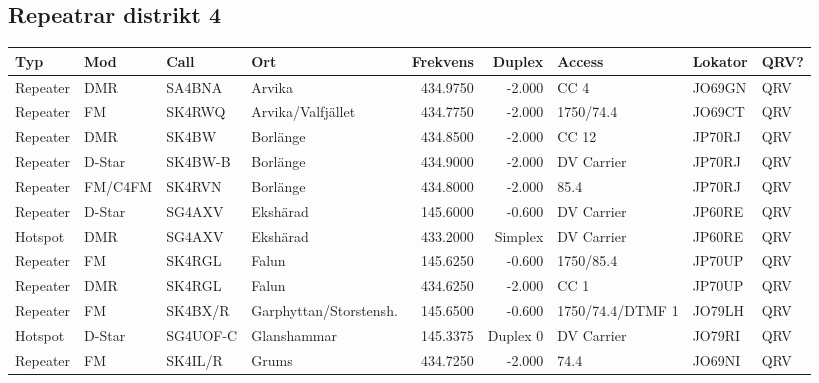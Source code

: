 \begin{landscape}
\clearpage

\subsection{Repeatrar distrikt 4}

\begin{longtable}{llllrrlll}
	\bf Typ  & \bf Mod    & \bf Call & \bf Ort                & \bf Frekvens & \bf Duplex & \bf Access       & \bf Lokator & \bf QRV? \\ \hline
	\endhead
	Repeater & DMR        & SA4BNA   & Arvika                 &     434.9750 &     -2.000 & CC 4             & JO69GN      & QRV      \\
	Repeater & FM         & SK4RWQ   & Arvika/Valfjället      &     434.7750 &     -2.000 & 1750/74.4        & JO69CT      & QRV      \\
	Repeater & DMR        & SK4BW    & Borlänge               &     434.8500 &     -2.000 & CC 12            & JP70RJ      & QRV      \\
	Repeater & D-Star     & SK4BW-B  & Borlänge               &     434.9000 &     -2.000 & DV Carrier       & JP70RJ      & QRV      \\
	Repeater & FM/C4FM    & SK4RVN   & Borlänge               &     434.8000 &     -2.000 & 85.4             & JP70RJ      & QRV      \\
	Repeater & D-Star     & SG4AXV   & Ekshärad               &     145.6000 &     -0.600 & DV Carrier       & JP60RE      & QRV      \\
	Hotspot  & DMR        & SG4AXV   & Ekshärad               &     433.2000 &    Simplex & DV Carrier       & JP60RE      & QRV      \\
	Repeater & FM         & SK4RGL   & Falun                  &     145.6250 &     -0.600 & 1750/85.4        & JP70UP      & QRV      \\
	Repeater & DMR        & SK4RGL   & Falun                  &     434.6250 &     -2.000 & CC 1             & JP70UP      & QRV      \\
	Repeater & FM         & SK4BX/R  & Garphyttan/Storstensh. &     145.6500 &     -0.600 & 1750/74.4/DTMF 1 & JO79LH      & QRV      \\
	Hotspot  & D-Star     & SG4UOF-C & Glanshammar            &     145.3375 &   Duplex 0 & DV Carrier       & JO79RI      & QRV      \\
	Repeater & FM         & SK4IL/R  & Grums                  &     434.7250 &     -2.000 & 74.4             & JO69NI      & QRV      \\

\end{longtable}
\end{landscape}
